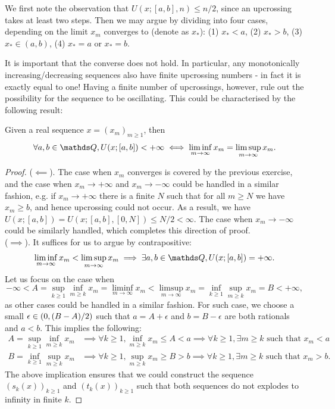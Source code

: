 \begin{hint}
We first note the observation that $U(x;[a,b],n) \leq n/2$, since an upcrossing takes at least two steps. Then we may argue by dividing into four cases, depending on the limit $x_m$ converges to (denote as $x_*$): (1) $x_* < a$, (2) $x_* > b$, (3) $x_* \in (a,b)$, (4) $x_* = a$ or $x_* = b$.
\end{hint}

It is important that the converse does not hold. In particular, any monotonically increasing/decreasing sequences also have finite upcrossing numbers - in fact it is exactly equal to one! Having a finite number of upcrossings, however, rule out the possibility for the sequence to be oscillating. This could be characterised by the following result:
\begin{lemma} \label{lem:relation_between_upcrossing_and_limit}
Given a real sequence $x = (x_m)_{m\geq 1}$, then 
$$\forall a,b \in \Q, U(x;[a,b]) < +\infty \iff \liminf_{m\to\infty} x_m = \limsup_{m\to\infty} x_m.$$
\end{lemma}

\begin{proof}
($\impliedby$). The case when $x_m$ converges is covered by the previous exercise, and the case when $x_m \to +\infty$ and $x_m \to -\infty$ could be handled in a similar fashion, e.g. if $x_m \to +\infty$ there is a finite $N$ such that for all $m \geq N$ we have $x_m \geq b$, and hence upcrossing could not occur. As a result, we have $U(x;[a,b]) = U(x;[a,b],[0,N]) \leq N/2 < \infty$. The case when $x_m \to -\infty$ could be similarly handled, which completes this direction of proof.\\

($\implies$). It suffices for us to argue by  contrapositive:
$$\liminf_{m\to\infty} x_m < \limsup_{m\to\infty} x_m \implies \exists a,b \in \Q, U(x;[a,b]) = +\infty.$$
Let us focus on the case when 
$$-\infty < A = \sup_{k\geq 1} \inf_{m\geq k} x_m = \liminf_{m\to\infty} x_m < \limsup_{m\to\infty} x_m = \inf_{k\geq 1} \sup_{m\geq k} x_m = B < +\infty,$$
as other cases could be handled in a similar fashion. For such case, we choose a small $\epsilon \in \left( 0,(B-A)/2 \right)$ such that $a = A+\epsilon$ and $b = B-\epsilon$ are both rationals and $a<b$. This implies the following:
\begin{align*}
    A = \sup_{k\geq 1} \inf_{m\geq k} x_m &\implies \forall k \geq 1, \inf_{m\geq k} x_m \leq A < a \implies \forall k \geq 1, \exists m \geq k \text{ such that } x_m < a \\
    B = \inf_{k\geq 1} \sup_{m\geq k} x_m &\implies \forall k \geq 1, \sup_{m\geq k} x_m \geq B > b \implies \forall k \geq 1, \exists m \geq k \text{ such that } x_m > b.
\end{align*}
The above implication ensures that we could construct the sequence $(s_k(x))_{k\geq 1}$ and $(t_k(x))_{k\geq 1}$ such that both sequences do not explodes to infinity in finite $k$.
\end{proof}

